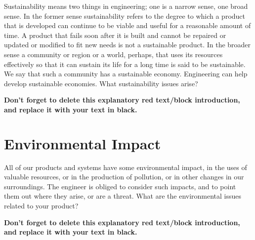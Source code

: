 \begin{tcolorbox}[      %
    boxrule=0pt,        %
    colback=white,      %
    coltext=red         %
]                       %
    Sustainability means two things in engineering; one is a narrow sense, one broad sense. In the former sense sustainability refers to the degree to which a product that is developed can continue to be viable and useful for a reasonable amount of time. A product that fails soon after it is built and cannot be repaired or updated or modified to fit new needs is not a sustainable product. In the broader sense a community or region or a world, perhaps, that uses its resources effectively so that it can sustain its life for a long time is said to be sustainable. We say that such a community has a sustainable economy. Engineering can help develop sustainable economies. What sustainability issues arise?
    
    \vspace{15pt}       %
    \begin{center}      %
    \textbf{Don't forget to delete this explanatory red text/block introduction, and replace it with your text in black.}
    \end{center}        %
\end{tcolorbox}         %

\section{Environmental Impact} %

\begin{tcolorbox}[      %
    boxrule=0pt,        %
    colback=white,      %
    coltext=red         %
]                       %
    All of our products and systems have some environmental impact, in the uses of valuable resources, or in the production of pollution, or in other changes in our surroundings. The engineer is obliged to consider such impacts, and to point them out where they arise, or are a threat. What are the environmental issues related to your product?
    
    \vspace{15pt}       %
    \begin{center}      %
    \textbf{Don't forget to delete this explanatory red text/block introduction, and replace it with your text in black.}
    \end{center}        %
\end{tcolorbox}         %

